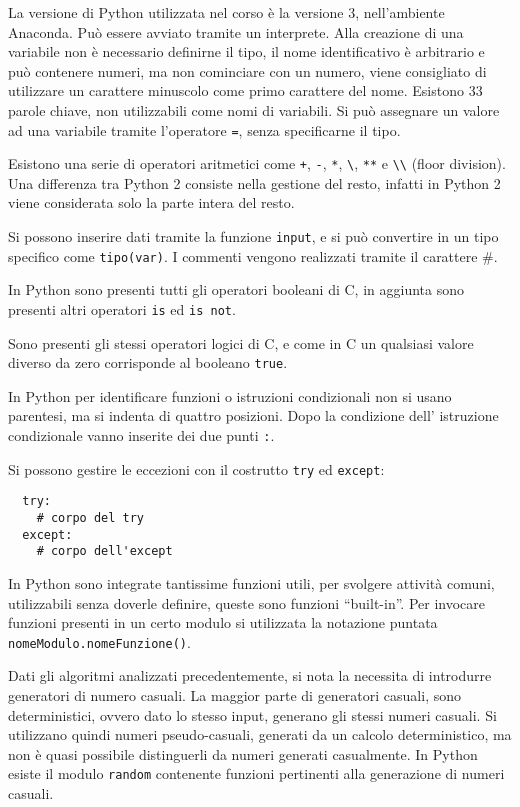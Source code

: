 \documentclass{article}
\numberwithin{equation}{subsection}
\begin{document}
La versione di Python utilizzata nel corso è la versione 3, nell'ambiente Anaconda. Può essere avviato tramite un interprete. Alla creazione di una variabile non 
è necessario definirne il tipo, il nome identificativo è arbitrario e può contenere numeri, ma non cominciare con un numero, viene consigliato di utilizzare un carattere 
minuscolo come primo carattere del nome. Esistono 33 parole chiave, non utilizzabili come nomi di variabili. Si può assegnare un valore ad una variabile tramite l'operatore 
\verb|=|, senza specificarne il tipo. 

Esistono una serie di operatori aritmetici come \verb|+|, \verb|-|, \verb|*|, \verb|\|, \verb|**| e \verb|\\| (floor division). Una differenza tra Python 2 consiste nella gestione del resto, infatti in Python 2 
viene considerata solo la parte intera del resto. 

Si possono inserire dati tramite la funzione \verb|input|, e si può convertire in un tipo specifico come \verb|tipo(var)|. I commenti vengono 
realizzati tramite il carattere \#. 

In Python sono presenti tutti gli operatori booleani di C, in aggiunta sono presenti altri operatori \verb|is| ed \verb|is not|. 


Sono presenti gli stessi operatori logici di C, e come in C un qualsiasi valore diverso da zero corrisponde al booleano \verb|true|. 

In Python per identificare funzioni o istruzioni condizionali non si usano parentesi, ma si indenta di quattro posizioni. Dopo la condizione dell'
istruzione condizionale vanno inserite dei due punti \verb|:|. 


Si possono gestire le eccezioni con il costrutto \verb|try| ed \verb|except|:
\begin{verbatim}
  try:
    # corpo del try
  except:
    # corpo dell'except
\end{verbatim}

In Python sono integrate tantissime funzioni utili, per svolgere attività comuni, utilizzabili senza doverle definire, queste sono funzioni ``built-in''. 
Per invocare funzioni presenti in un certo modulo si utilizzata la notazione puntata \verb|nomeModulo.nomeFunzione()|. 


Dati gli algoritmi analizzati precedentemente, si nota la necessita di introdurre generatori di numero casuali. La maggior parte di generatori casuali, sono deterministici, 
ovvero dato lo stesso input, generano gli stessi numeri casuali. Si utilizzano quindi numeri pseudo-casuali, generati da un calcolo deterministico, ma non è quasi possibile 
distinguerli da numeri generati casualmente. In Python esiste il modulo \verb|random| contenente funzioni pertinenti alla generazione di numeri casuali. 
\end{document}

